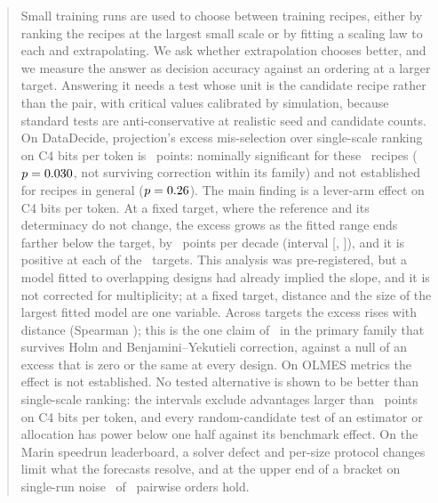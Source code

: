 \documentclass{article}
\begin{document}
\printAffiliationsAndNotice{}

\begin{abstract}
Small training runs are used to choose between training recipes, either by
ranking the recipes at the largest small scale or by fitting a scaling law to
each and extrapolating. We ask whether extrapolation chooses better, and we
measure the answer as decision accuracy against an ordering at a larger target.
Answering it needs a test whose unit is the candidate recipe rather than the
pair, with critical values calibrated by simulation, because standard tests
are anti-conservative at realistic seed and candidate counts. On DataDecide,
projection's excess mis-selection over single-scale ranking on C4 bits per
token is \headEstimate\ points: nominally significant for these \nCandidates\
recipes ($p=\headFixedP$, not surviving correction within its family) and not
established for recipes in general ($p=\headRandomP$). The main finding is a
lever-arm effect on C4 bits per token. At a fixed target, where the reference
and its determinacy do not change, the excess grows as the fitted range ends
farther below the target, by \ftFixedTargetPooled\ points per decade (interval
[\ftFixedTargetPooledLow, \ftFixedTargetPooledHigh]), and it is positive at each
of the \ftTargets\ targets. This analysis was pre-registered, but a model fitted
to overlapping designs had already implied the slope, and it is not corrected
for multiplicity; at a fixed target, distance and the size of the largest fitted
model are one variable. Across targets the excess rises with distance (Spearman
\leverRealRho); this is the one claim of \restatedPrimaryM\ in the primary
family that survives Holm and Benjamini--Yekutieli correction, against a null
of an excess that is zero or the same at every design. On OLMES metrics the
effect is not established. No tested alternative is shown to be better than
single-scale ranking: the intervals exclude advantages larger than
\advExcludeCFourMax\ points on C4 bits per token, and every random-candidate
test of an estimator or allocation has power below one half against its
benchmark effect. On the
Marin speedrun leaderboard, a solver defect and per-size protocol changes limit
what the forecasts resolve, and at the upper end of a bracket on single-run
noise \marinHold\ of \marinPairs\ pairwise orders hold.
\end{abstract}
\end{document}
